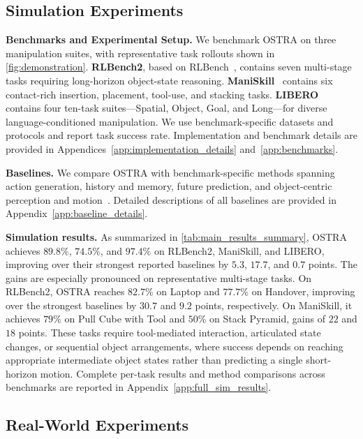 \subsection{Simulation Experiments}
\label{sec:simulation_experiments}

\textbf{Benchmarks and Experimental Setup.}
We benchmark OSTRA on three manipulation suites, with representative task
rollouts shown in \cref{fig:demonstration}.
\textbf{RLBench2}, based on RLBench~\citep{James2020RLBench}, contains seven
multi-stage tasks requiring long-horizon object-state reasoning.
\textbf{ManiSkill}~\citep{Gu2023ManiSkill2} contains six contact-rich insertion,
placement, tool-use, and stacking tasks.
\textbf{LIBERO}~\citep{liu2023libero} contains four ten-task suites---Spatial,
Object, Goal, and Long---for diverse language-conditioned manipulation.
We use benchmark-specific datasets and protocols and report task success rate.
Implementation and benchmark details are provided in
Appendices~\ref{app:implementation_details} and~\ref{app:benchmarks}.


\textbf{Baselines.}
We compare OSTRA with benchmark-specific methods spanning action generation,
history and memory, future prediction, and object-centric perception and
motion~\citep{Zhao2023Learning,chi2024diffusionpolicy,Ze2024DP3,
Fang2025SAM2Act,Yang2025PPI,zhu2023learning,Hsu2025SPOT}.
Detailed descriptions of all baselines are provided in
Appendix~\ref{app:baseline_details}.

\textbf{Simulation results.}
As summarized in \cref{tab:main_results_summary}, OSTRA achieves $89.8\%$,
$74.5\%$, and $97.4\%$ on RLBench2, ManiSkill, and LIBERO, improving over
their strongest reported baselines by $5.3$, $17.7$, and $0.7$ points.
The gains are especially pronounced on representative multi-stage tasks. On
RLBench2, OSTRA reaches $82.7\%$ on Laptop and $77.7\%$ on Handover, improving
over the strongest baselines by $30.7$ and $9.2$ points, respectively. On
ManiSkill, it achieves $79\%$ on Pull Cube with Tool and $50\%$ on Stack
Pyramid, gains of $22$ and $18$ points. These tasks require tool-mediated
interaction, articulated state changes, or sequential object arrangements,
where success depends on reaching appropriate intermediate object states
rather than predicting a single short-horizon motion.
Complete per-task results and method comparisons across benchmarks are reported in
Appendix~\ref{app:full_sim_results}.

\subsection{Real-World Experiments}
\label{sec:real_world_experiments}


